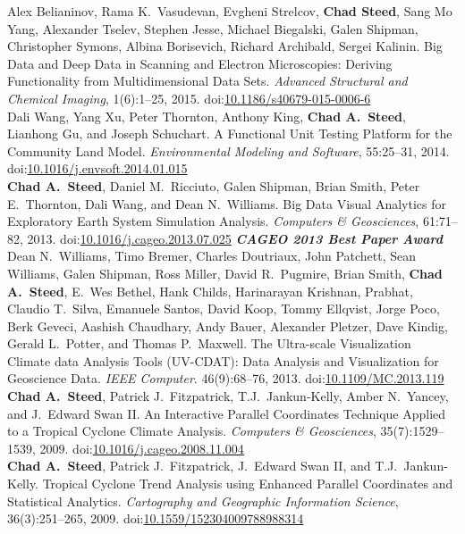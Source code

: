 \documentclass[11pt, letterpaper]{article}
\newcommand{\amper}{{\fontspec[Scale=.95]{Hoefler Text}\selectfont\itshape\&}}
\newcommand{\years}[1]{\marginnote{\scriptsize #1}}
\begin{document}
\begin{sloppypar}
\years{2015}Alex Belianinov, Rama K.\ Vasudevan, Evgheni Strelcov,
\textbf{Chad Steed}, Sang Mo Yang, Alexander Tselev, Stephen Jesse,
Michael Biegalski, Galen Shipman, Christopher Symons, Albina Borisevich,
Richard Archibald, Sergei Kalinin.  Big Data and Deep Data in Scanning
and Electron Microscopies: Deriving Functionality from Multidimensional Data
Sets. \emph{Advanced Structural and Chemical Imaging}, 1(6):1--25, 2015.
doi:\href{http://dx.doi.org/10.1186/s40679-015-0006-6}
{10.1186/s40679-015-0006-6}\\
\years{2014}Dali Wang, Yang Xu, Peter Thornton, Anthony King,
\textbf{Chad A.\ Steed}, Lianhong Gu, and Joseph Schuchart.
A Functional Unit Testing Platform for the Community Land Model.
\emph{Environmental Modeling and Software}, 55:25--31, 2014.
doi:\href{http://dx.doi.org/10.1016/j.envsoft.2014.01.015}
{10.1016/j.envsoft.2014.01.015}\\
\years{2013}\textbf{Chad A.\ Steed}, Daniel M.\ Ricciuto, Galen Shipman,
Brian Smith, Peter E.\ Thornton, Dali Wang, and Dean N.\ Williams.
Big Data Visual Analytics for Exploratory Earth System Simulation Analysis.
\emph{Computers \amper{} Geosciences}, 61:71--82, 2013.
doi:\href{http://dx.doi.org/10.1016/j.cageo.2013.07.025}
{10.1016/j.cageo.2013.07.025}
\textbf{\emph{CAGEO 2013 Best Paper Award}}\\
\years{2013}Dean N.\ Williams, Timo Bremer, Charles Doutriaux, John Patchett,
Sean Williams, Galen Shipman, Ross Miller, David R.\ Pugmire, Brian Smith,
\textbf{Chad A.\ Steed}, E.\ Wes Bethel, Hank Childs, Harinarayan Krishnan,
Prabhat, Claudio T.\ Silva, Emanuele Santos, David Koop, Tommy Ellqvist,
Jorge Poco, Berk Geveci, Aashish Chaudhary, Andy Bauer, Alexander Pletzer,
Dave Kindig, Gerald L.\ Potter, and Thomas P.\ Maxwell. The Ultra-scale
Visualization Climate data Analysis Tools (UV-CDAT): Data Analysis and
Visualization for Geoscience Data. \emph{IEEE Computer}. 46(9):68--76, 2013.
doi:\href{http://dx.doi.org/10.1109/MC.2013.119}{10.1109/MC.2013.119}\\
\years{2009}\textbf{Chad A.\ Steed}, Patrick J.\ Fitzpatrick, T.J.\ Jankun-Kelly,
Amber N.\ Yancey, and J.\ Edward Swan II. An Interactive
Parallel Coordinates Technique Applied to a Tropical Cyclone Climate
Analysis. \emph{Computers \amper{} Geosciences}, 35(7):1529--1539, 2009.
doi:\href{http://dx.doi.org/10.1016/j.cageo.2008.11.004}
{10.1016/j.cageo.2008.11.004}\\
\years{2009}\textbf{Chad A.\ Steed}, Patrick J.\ Fitzpatrick, J.\ Edward Swan
II, and T.J.\ Jankun-Kelly. Tropical Cyclone Trend Analysis using Enhanced
Parallel Coordinates and Statistical Analytics. \emph{Cartography and
Geographic Information Science}, 36(3):251--265, 2009.
doi:\href{http://dx.doi.org/10.1559/152304009788988314}{10.1559/152304009788988314}
\end{sloppypar}
\end{document}
